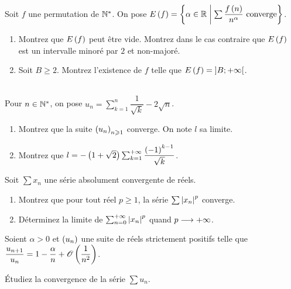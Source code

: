 \begin{corr}
\end{corr}

\begin{exo}
Soit \(f\) une permutation de \(\mathbb{N}^*\). On pose \(E\left(f\right)=\left\lbrace\alpha\in\mathbb{R}\;\middle|\;\sum\dfrac{f\left(n\right)}{n^\alpha}\text{ converge}\right\rbrace\).

\begin{enumerate}
    \item Montrez que \(E\left(f\right)\) peut être vide. Montrez dans le cas contraire que \(E\left(f\right)\) est un intervalle minoré par \(2\) et non-majoré. \\
    \item Soit \(B\geq2\). Montrez l'existence de \(f\) telle que \(E\left(f\right)=\left]B;+\infty\right[\).
\end{enumerate}
\end{exo}

\begin{corr}
\end{corr}

\begin{exo}[Oral X, 18]~\\
Pour \(n\in\mathbb{N}^*\), on pose \(u_n=\sum_{k=1}^n\dfrac{1}{\sqrt{k}}-2\sqrt{n}\).

\begin{enumerate}
    \item Montrez que la suite \(\left(u_n\right)_{n\geqslant1}\) converge. On note \(l\) sa limite. \\
    \item Montrez que \(l=-\left(1+\sqrt{2}\right)\sum_{k=1}^{+\infty}\dfrac{\left(-1\right)^{k-1}}{\sqrt{k}}\).
\end{enumerate}
\end{exo}

\begin{corr}
\end{corr}

\begin{exo}[Oral X, 19]
Soit \(\sum x_n\) une série absolument convergente de réels.

\begin{enumerate}
    \item Montrez que pour tout réel \(p\geq1\), la série \(\sum\left\lvert x_n\right\rvert^p\) converge. \\
    \item Déterminez la limite de \(\sum_{n=0}^{+\infty}\left\lvert x_n\right\rvert^p\) quand \(p\longrightarrow+\infty\).
\end{enumerate}
\end{exo}

\begin{corr}
\end{corr}

\begin{exo}[Oral X, 20]
Soient \(\alpha>0\) et \(\left(u_n\right)\) une suite de réels strictement positifs telle que \(\dfrac{u_{n+1}}{u_n}=1-\dfrac{\alpha}{n}+\mathscr{O}\left(\dfrac{1}{n^2}\right)\).

Étudiez la convergence de la série \(\sum u_n\).
\end{exo}

\begin{corr}
\end{corr}

